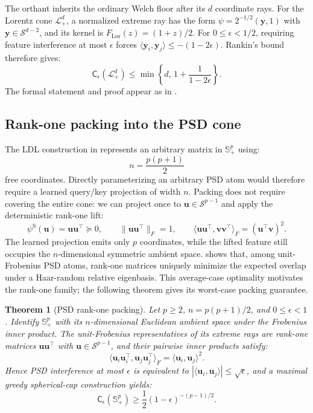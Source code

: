 \documentclass{article}
\newcommand{\1}{\bm{1}}
\newcommand{\norm}[1]{\lVert {#1} \rVert}
\newcommand{\lrangle}[1]{\langle#1\rangle}
\newcommand{\sphere}[1]{\gS^{#1}}
\def\eps{{\epsilon}}
\def\vu{{\bm{u}}}
\def\vv{{\bm{v}}}
\def\vy{{\bm{y}}}
\def\gL{{\mathcal{L}}}
\def\gS{{\mathcal{S}}}
\def\sS{{\mathbb{S}}}
\newtheorem{theorem}{Theorem}
\theoremstyle{definition}
\begin{document}
The orthant inherits the ordinary Welch floor after its $d$ coordinate rays. For the Lorentz cone
$\gL_+^d$, a normalized extreme ray has the form
$\psi=2^{-1/2}(\vy,1)$ with $\vy\in\sphere{d-2}$, and its kernel is
$F_{\mathrm{Lor}}(z)=(1+z)/2$. For $0\le\eps<1/2$, requiring feature interference at most $\eps$ forces
$\lrangle{\vy_i,\vy_j}\le-(1-2\eps)$. Rankin's bound therefore gives:
\[
  \mathsf{C}_{\eps}(\gL_+^d)
  \le \min\!\left\{d,\,1+\frac{1}{1-2\eps}\right\}.
\]
The formal statement and proof appear as  in .

\subsection{Rank-one packing into the PSD cone}
\label{ssec:spd-welch}

The LDL construction in  represents an arbitrary matrix in $\sS_+^p$ using:
\begin{equation}
  n=\frac{p(p+1)}{2}
  \label{eq:psd-ambient-dim}
\end{equation}
free coordinates. Directly parameterizing an arbitrary PSD atom would therefore require a learned
query/key projection of width $n$. Packing does not require covering the entire cone: we can project
once to $\vu\in\sphere{p-1}$ and apply the deterministic rank-one lift:
\[
  \psi^{\mathrm S}(\vu)=\vu\vu^\top\succeq0,
  \qquad
  \norm{\vu\vu^\top}_F=1,
  \qquad
  \lrangle{\vu\vu^\top,\vv\vv^\top}_F=(\vu^\top\vv)^2.
\]
The learned projection emits only $p$ coordinates, while the lifted feature still occupies the
$n$-dimensional symmetric ambient space.  shows that, among unit-Frobenius
PSD atoms, rank-one matrices uniquely minimize the expected overlap under a Haar-random relative
eigenbasis. This average-case optimality motivates the rank-one family; the following theorem gives
its worst-case packing guarantee.

\begin{theorem}[PSD rank-one packing]
  \label{thm:cap-spd}
  Let $p\ge2$, $n=p(p+1)/2$, and $0\le\eps<1$. Identify $\sS_+^p$ with its
  $n$-dimensional Euclidean ambient space under the Frobenius inner product. The unit-Frobenius representatives of its extreme rays are rank-one matrices
  $\vu\vu^\top$ with $\vu\in\sphere{p-1}$, and their pairwise inner products satisfy:
  \[
    \lrangle{\vu_i\vu_i^\top,\vu_j\vu_j^\top}_F
    =\lrangle{\vu_i,\vu_j}^2.
  \]
  Hence PSD interference at most $\eps$ is equivalent to
  $|\lrangle{\vu_i,\vu_j}|\le\sqrt{\eps}$, and a maximal greedy spherical-cap construction yields:
  \begin{equation}
    \mathsf{C}_{\eps}(\sS_+^p)
    \ge \frac{1}{2}(1-\eps)^{-(p-1)/2}.
  \end{equation}
\end{theorem}
\end{document}
